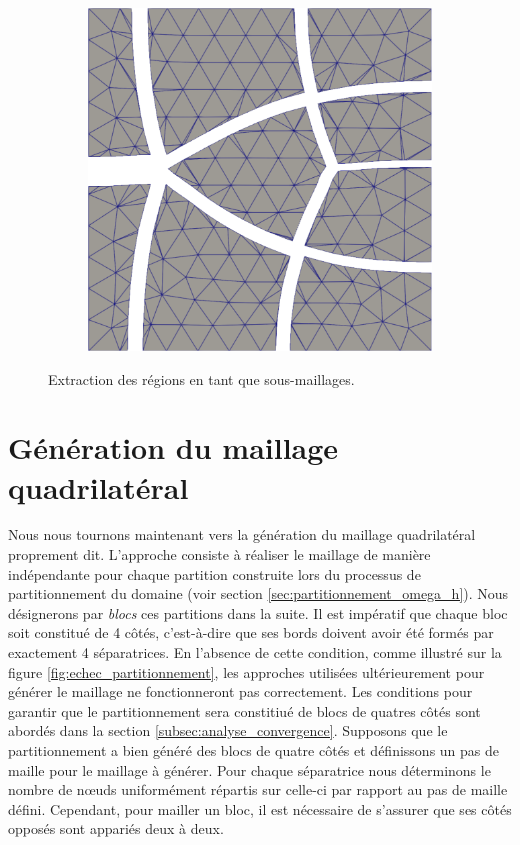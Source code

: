 \begin{figure}[h!]
\begin{subfigure}{0.49\textwidth}
    \includegraphics[width=\textwidth]{images/eclatement_3.pdf}
\end{subfigure}
\caption{Extraction des régions en tant que sous-maillages.}
\label{fig:eclatement}
\end{figure}


\section{Génération du maillage quadrilatéral}
\label{sec:gen_mesh_quad}

Nous nous tournons maintenant vers la génération du maillage quadrilatéral proprement dit. L'approche consiste à réaliser le maillage de manière indépendante pour chaque partition construite lors du processus de partitionnement du domaine (voir section \ref{sec:partitionnement_omega_h}). Nous désignerons par \emph{blocs} ces partitions dans la suite. Il est impératif que chaque bloc soit constitué de 4 côtés, c'est-à-dire que ses bords doivent avoir été formés par exactement 4 séparatrices. En l'absence de cette condition, comme illustré sur la figure \ref{fig:echec_partitionnement}, les approches utilisées ultérieurement pour générer le maillage ne fonctionneront pas correctement. Les conditions pour garantir que le partitionnement sera constitiué de blocs de quatres côtés sont abordés dans la section \ref{subsec:analyse_convergence}. Supposons que le partitionnement a bien généré des blocs de quatre côtés et définissons un pas de maille pour le maillage à générer. Pour chaque séparatrice nous déterminons le nombre de nœuds uniformément répartis sur celle-ci par rapport au pas de maille défini. Cependant, pour mailler un bloc, il est nécessaire de s'assurer que ses côtés opposés sont appariés deux à deux.

